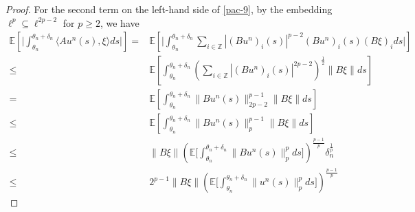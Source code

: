 \documentclass[11pt]{article}
\numberwithin{equation}{section}
\theoremstyle{plain}
\begin{document}
\begin{proof}
 For the second term on the left-hand side of \eqref{pac-9}, 
by the embedding
$\ell^p \subseteq \ell^{2p-2}$ 
for $p \ge 2$, we have
 \begin{align} \label{pac-10}
       \mathbb{E} 
                 \left[ \Big|
                              \int_{\theta_n}^{\theta_n + \delta_n} 
                                     \langle A u^n(s), \xi \rangle ds 
                           \Big|
                 \right] 
    = & \mathbb{E} 
                  \left[ \Big|
                                 \int_{\theta_n}^{\theta_n + \delta_n} 
                                        \sum_{i \in \mathbb{Z} }
                                            | (B u^n)_i(s)|^{p-2} (B u^n)_i(s) (B\xi)_i  ds 
                              \Big|
                    \right]   \nonumber\\
  \le & \mathbb{E} 
                  \left[ \int_{\theta_n}^{\theta_n + \delta_n} 
                                        \left( \sum_{i \in \mathbb{Z} }
                                                     | (B u^n)_i(s)|^{2p-2} 
                                        \right)^{\frac{1}{2} }
                                        \| B\xi\|  ds
                    \right]   \nonumber\\     
   = & \mathbb{E} 
                  \left[ \int_{\theta_n}^{\theta_n + \delta_n} 
                                        \| B u^n(s) \|_{2p-2}^{p - 1}
                                        \| B\xi\|  ds
                    \right]   \nonumber\\  
 \le & \mathbb{E} 
                   \left[ \int_{\theta_n}^{\theta_n + \delta_n} 
                                         \| B u^n(s) \|_p^{p - 1}
                                         \| B\xi\|  ds
                     \right]   \nonumber\\                                                                              
    \le & \|B\xi \| 
             \left( \mathbb{E} 
                             \bigg[ \int_{\theta_n}^{\theta_n + \delta_n} 
                                         \|B u^n(s)\|_p^p ds 
                              \bigg] 
             \right)^{\frac{p-1}{p} } 
             \delta_n^{\frac{1}{p} }  \nonumber\\ 
     \le &2^{p-1} \|B\xi \| 
                  \left( \mathbb{E} 
                                  \bigg[ \int_{\theta_n}^{\theta_n + \delta_n} 
                                               \|u^n(s)\|_p^p ds 
                                   \bigg] 
                  \right)^{\frac{p-1}{p} } 

\end{align}
\end{proof}
\end{document}
